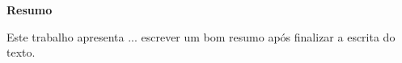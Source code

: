
\begin{center}

{\bf Resumo}
\end{center}

Este trabalho apresenta ... escrever um bom resumo ap\'os finalizar a escrita do texto. 
